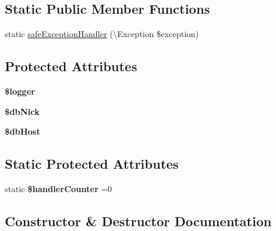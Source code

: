 \subsection*{Static Public Member Functions}
\begin{DoxyCompactItemize}
\item 
static \mbox{\hyperlink{class_pes_1_1_database_1_1_handler_1_1_handler_a304e15cc58ef18bb2819523ef497d18e}{safe\+Exception\+Handler}} (\textbackslash{}Exception \$exception)
\end{DoxyCompactItemize}
\subsection*{Protected Attributes}
\begin{DoxyCompactItemize}
\item 
\mbox{\label{class_pes_1_1_database_1_1_handler_1_1_handler_aebfec76216371ef236acc5910e90933d}} 
{\bfseries \$logger}
\item 
\mbox{\label{class_pes_1_1_database_1_1_handler_1_1_handler_a462dc7e80b8f4f7cedfffda4005cea46}} 
{\bfseries \$db\+Nick}
\item 
\mbox{\label{class_pes_1_1_database_1_1_handler_1_1_handler_ad0ddb2725e69c88a729e0cc242a1b2a6}} 
{\bfseries \$db\+Host}
\end{DoxyCompactItemize}
\subsection*{Static Protected Attributes}
\begin{DoxyCompactItemize}
\item 
\mbox{\label{class_pes_1_1_database_1_1_handler_1_1_handler_aa83618c5a5bb607a365c296701a8a41b}} 
static {\bfseries \$handler\+Counter} =0
\end{DoxyCompactItemize}


\subsection{Constructor \& Destructor Documentation}
\mbox{\label{class_pes_1_1_database_1_1_handler_1_1_handler_acee29348571a4eefdc011645312606e3}} 
